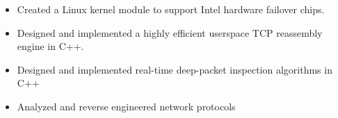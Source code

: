 \documentclass[margin,line]{resume}
\begin{document}
\begin{resume}
\begin{itemize}
\item Created a Linux kernel module to support Intel hardware failover
      chips.
\item Designed and implemented a highly efficient userspace TCP reassembly
      engine in C++.
\item Designed and implemented real-time deep-packet inspection algorithms in C++
\item Analyzed and reverse engineered network protocols
\end{itemize}


\end{resume}
\end{document}
